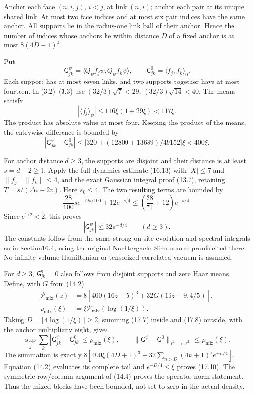 \documentclass[
]{article}
\begin{document}
Anchor each face \((n;i,j)\), \(i<j\), at link \((n,i)\); anchor each
pair at its unique shared link. At most two face indices and at most six
pair indices have the same anchor. All supports lie in the radius-one
link ball of their anchor. Hence the number of indices whose anchors lie
within distance \(D\) of a fixed anchor is at most \(8(4D+1)^3\).

Put \[
\mathsf G^\psi_{jk}
=\langle Q_\psi f_j\psi,Q_\psi f_k\psi\rangle,\qquad
\mathsf G^0_{jk}=\langle f_j,f_k\rangle_0 .
\] Each support has at most seven links, and two supports together have
at most fourteen. In (3.2)--(3.3) use \((32/3)\sqrt7<29\),
\((32/3)\sqrt{14}<40\). The means satisfy \[
|\langle f_j\rangle_\psi|
\le116\xi(1+29\xi)<117\xi.
\] The product has absolute value at most four. Keeping the product of
the means, the entrywise difference is bounded by \[
|\mathsf G^\psi_{jk}-\mathsf G^0_{jk}|
\le\bigl[320+(12800+13689)/49152\bigr]\xi<400\xi.              \tag{17.7}
\]

For anchor distance \(d\ge3\), the supports are disjoint and their
distance is at least \(s=d-2\ge1\). Apply the full-dynamics estimate
(16.13) with \(|X|\le7\) and \(\|f_j\|\|f_k\|\le4\), and the exact
Gaussian integral proof (13.7), retaining \(T=s/(\Delta_*+2v)\). Here
\(s_0\le4\). The two resulting terms are bounded by \[
\frac{28}{100}s e^{-99s/100}+12e^{-s/4}
\le\left(\frac{28}{74}+12\right)e^{-s/4}.
\] Since \(e^{1/2}<2\), this proves \[
|\mathsf G^\psi_{jk}|\le32e^{-d/4}\qquad(d\ge3).             \tag{17.8}
\] The constants follow from the same strong on-site evolution and
spectral integrals as in Section16.4, using the original
Nachtergaele--Sims source proofs cited there. No infinite-volume
Hamiltonian or tensorized correlated vacuum is assumed.

For \(d\ge3\), \(\mathsf G^0_{jk}=0\) also follows from disjoint
supports and zero Haar means. Define, with \(G\) from (14.2), \[
\begin{split}
\mathcal P_{\mathrm{mix}}(z)
 &=8\left[400(16z+5)^3+32G(16z+9,4/5)\right],\\
\rho_{\mathrm{mix}}(\xi)
 &=\xi\mathcal P_{\mathrm{mix}}(\log(1/\xi)).
\end{split}                                                   \tag{17.9}
\] Taking \(D=\lceil4\log(1/\xi)\rceil\ge2\), summing (17.7) inside and
(17.8) outside, with the anchor multiplicity eight, gives \[
\sup_j\sum_k|\mathsf G^\psi_{jk}-\mathsf G^0_{jk}|
\le\rho_{\mathrm{mix}}(\xi),\qquad
\|\mathsf G^\psi-\mathsf G^0\|_{\ell^2\to\ell^2}
\le\rho_{\mathrm{mix}}(\xi).                                \tag{17.10}
\] The summation is exactly
\(8[400\xi(4D+1)^3+32\sum_{n>D}(4n+1)^3e^{-n/4}]\). Equation (14.2)
evaluates its complete tail and \(e^{-D/4}\le\xi\) proves (17.10). The
symmetric row/column argument of (14.4) proves the operator-norm
statement. Thus the mixed blocks have been bounded, not set to zero in
the actual density.
\end{document}
